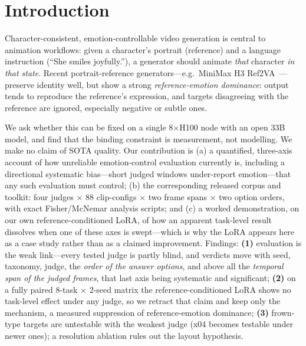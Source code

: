 \documentclass[conference]{IEEEtran}
\begin{document}
\section{Introduction}
Character-consistent, emotion-controllable video generation is central to animation workflows:
given a character's portrait (reference) and a language instruction (``She smiles joyfully.''),
a generator should animate \emph{that} character \emph{in that state}. Recent portrait-reference
generators---e.g.\ MiniMax H3 Ref2VA~\cite{minimax2025}---preserve identity well, but show a strong
\emph{reference-emotion dominance}: output tends to reproduce the reference's expression, and
targets disagreeing with the reference are ignored, especially negative or subtle ones.

We ask whether this can be fixed on a single 8$\times$H100 node with an open 33B model, and find that the
binding constraint is measurement, not modelling. We make no claim of SOTA quality. Our contribution is
(a) a quantified, three-axis account of how unreliable emotion-control evaluation currently is, including
a directional systematic bias---short judged windows under-report emotion---that any such evaluation must
control; (b) the corresponding released corpus and toolkit: four judges $\times$ 88 clip-configs
$\times$ two frame spans $\times$ two option orders, with exact Fisher/McNemar analysis scripts; and
(c) a worked demonstration, on our own reference-conditioned LoRA, of how an apparent task-level result
dissolves when one of these axes is swept---which is why the LoRA appears here as a case study rather
than as a claimed improvement.
Findings: \textbf{(1)} evaluation is the weak link---every tested judge is partly blind, and verdicts
move with seed, taxonomy, judge, the \emph{order of the answer options}, and above all the
\emph{temporal span of the judged frames}, that last axis being systematic and significant;
\textbf{(2)} on a fully paired 8-task $\times$ 2-seed matrix the reference-conditioned LoRA shows no
task-level effect under any judge, so we retract that claim and keep only the mechanism, a measured
suppression of reference-emotion dominance; \textbf{(3)} frown-type targets are untestable with the
weakest judge (x04 becomes testable under newer ones); a resolution ablation rules out the layout
hypothesis.
\end{document}
